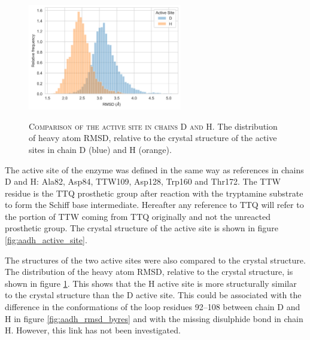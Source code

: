 \begin{figure}
    \centering
    \caption[Comparison of the active site in chains D and H]{\textsc{Comparison of the active site in chains D and H}. The distribution of heavy atom RMSD, relative to the crystal structure of the active sites in chain D (blue) and H (orange). }
    \includegraphics[width=0.6\textwidth]{chapters/aadh/figures/rmsd_dististribution.png}
    \label{fig:as_rmsd_dist}
\end{figure}

The active site of the enzyme was defined in the same way as references  \cite{ranaghanInitioQMMM2017, masgrauAtomicDescriptionEnzyme2006, masgrauTunnelingClassicalPaths2007} in chains D and H: Ala82, Asp84, TTW109, Asp128, Trp160 and Thr172. The TTW residue is the TTQ prosthetic group after reaction with the tryptamine substrate to form the Schiff base intermediate. Hereafter any reference to TTQ will refer to the portion of TTW coming from TTQ originally and not the unreacted prosthetic group. The crystal structure of the active site is shown in figure \ref{fig:aadh_active_site}. 

The structures of the two active sites were also compared to the crystal structure. The distribution of the heavy atom RMSD, relative to the crystal structure, is shown in figure \ref{fig:as_rmsd_dist}. This shows that the H active site is more structurally similar to the crystal structure than the D active site. This could be associated with the difference in the conformations of the loop residues \numrange[range-phrase=\text{--}]{92}{108} between chain D and H in figure \ref{fig:aadh_rmsd_byres} and with the missing disulphide bond in chain H. However, this link has not been investigated. 

